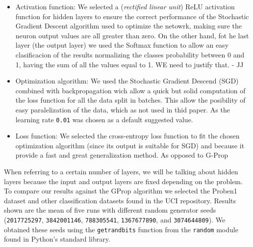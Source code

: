 \documentclass[runningheads]{llncs}
\begin{document}
\begin{itemize}

\item Activation function: We selected a (\emph{rectified linear unit}) ReLU
  activation function for hidden layers to ensure the correct performance of
  the Stochastic Gradient Descent algorithm used to optimize the netowrk,
  making sure the neuron output values are all greater than zero.  On the other
  hand, fot he last layer (the output layer) we used the Softmax function to
  allow an easy clasificacion of the results normalizing the classes
  probability between 0 and 1, having the sum of all the values equal to 1. %
  WE need to justify that. - JJ

\item Optimization algorithm: We used the Stochastic Gradient Descend
  (SGD) combined with backpropagation wich allow a quick but solid computation
  of the loss function for all the data split in batches. This allow the
  posibility of easy paralelization of the data, which as not used in thid
  paper. As the learning rate \texttt{0.01} was chosen as a default suggested
  value.

\item Loss function: We selected the cross-entropy loss function to fit the
  chosen optimization algorithm (since its output is suitable for SGD) and
  because it provide a fast and great generalization method. As opposed to
  G-Prop

\end{itemize}

When referring to a certain number of layers, we will be talking about hidden
layers because the input and output layers are fixed depending on the problem.
To compare our results against the GProp algorithm we selected the Proben1
\cite{Proben1} dataset and other classification datasets found in the UCI
\cite{uci} repository. Results shown are the mean of five runs with different
random generator seeds (\texttt{2017725297}, \texttt{3842001146},
\texttt{788305541}, \texttt{1367677890}, and \texttt{3074644809}). We obtained
these seeds using the \texttt{getrandbits} function from the \texttt{random}
module found in Python's standard library.

\end{document}
